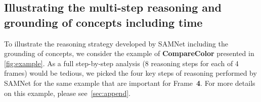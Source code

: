 
\subsection{Illustrating the multi-step reasoning and grounding of concepts including time}

To illustrate the reasoning strategy developed by SAMNet including the grounding of concepts, we consider the example
of \textbf{CompareColor} presented in \cref{fig:example}. 
As a full step-by-step analysis (8 reasoning steps for each of 4 frames) would be tedious, we picked the four key steps
of reasoning performed by SAMNet for the same example that are important for Frame~\textbf{4}.
For more details on this example, please see~\cref{sec:append}.

